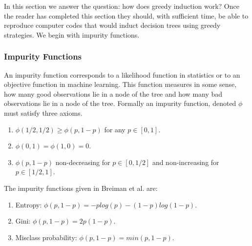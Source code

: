 In this section we answer the question: how does greedy induction work? Once the reader has completed this section they should, with sufficient time, be able to reproduce computer codes that would induct decision trees using greedy strategies. We begin with impurity functions. 

\subsubsection{Impurity Functions}

An impurity function corresponds to a likelihood function in statistics or to an objective function in machine learning. This function measures in some sense, how many good observations lie in a node of the tree and how many bad observations lie in a node of the tree. Formally an impurity function, denoted $\phi$ must satisfy three axioms. 

\begin{enumerate}
\item $\phi(1/2,1/2) \geq \phi(p, 1-p)$ for any $p\in[0,1]$. 
\item $\phi(0,1)=\phi(1,0)=0$. 
\item $ \phi(p, 1-p)$ non-decreasing for $p\in[0,1/2]$ and non-increasing for $p\in[1/2,1]$. 
\end{enumerate}

The impurity functions given in Breiman et al. \cite{breiman1984classification} are: 
\begin{enumerate}
\item Entropy: $\phi(p,1-p)= -plog(p) -(1-p)log(1-p)$.
\item Gini: $\phi(p, 1-p)=2p(1-p)$.
\item Misclass probability: $\phi(p, 1-p)=min(p,1-p).$
\end{enumerate}

